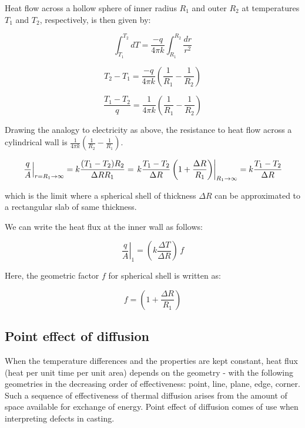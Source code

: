 Heat flow across a hollow sphere of inner radius $R_1$ and outer $R_2$ at
temperatures $T_1$ and $T_2$, respectively, is then given by:

$$ \int_{T_1}^{T_2}{dT} = \frac{-q}{4\pi k} \int_{R_1}^{R_2}{\frac{dr}{r^2}}$$

$$ T_2 - T_1 = \frac{-q}{4\pi k} \left( \frac{1}{R_1} - \frac{1}{R_2} \right) $$

\begin{equation}
\boxed{
  \frac{T_1 - T_2}{q} = \frac{1}{4\pi k} \left( \frac{1}{R_1} - \frac{1}{R_2}
\right)
}
\end{equation}

Drawing the analogy to electricity as above, the resistance to heat flow across
a cylindrical wall is $\frac{1}{4\pi k} \left( \frac{1}{R_2} - \frac{1}{R_1}
\right)$.

$$\left. \frac{q}{A} \right|_{r=R_1 \rightarrow \infty} =  k \frac{(T_1 -
T_2)R_2}{\Delta R R_1} = \left. k \frac{T_1 - T_2}{\Delta R} \left( 1 + {\Delta
R \over R_1}\right) \right|_{R_1 \rightarrow \infty} = k {T_1 - T_2 \over \Delta
R}$$

which is the limit where a spherical shell of thickness $\Delta R$ can be
approximated to a rectangular slab of same thickness.

We can write the heat flux at the inner wall as follows:

\begin{equation}
	\left. \frac{q}{A} \right|_{1} = \left( k \frac{\Delta T}{\Delta R} \right) \, f 
\end{equation}

Here, the geometric factor $f$ for spherical shell is written as:

\begin{equation}
	f = \left(1 + \frac{\Delta R}{R_1} \right)
\end{equation}


\subsection{Point effect of diffusion}

When the temperature differences and the properties are kept constant, heat flux
(heat per unit time per unit area) depends on the geometry - with the following
geometries in the decreasing order of effectiveness: point, line, plane, edge,
corner. Such a sequence of effectiveness of thermal diffusion arises from the
amount of space available for exchange of energy. Point effect of diffusion comes of use when interpreting defects in casting.

